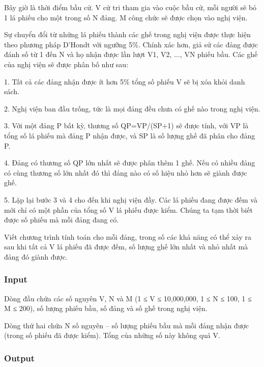 



   Bây giờ là thời điểm bầu cử. V cử tri tham gia vào cuộc bầu cử, mỗi người sẽ bỏ 1 lá phiếu cho một trong số N đảng. M công chức sẽ được chọn vào nghị viện.  

   Sự chuyển đổi từ những lá phiếu thành các ghế trong nghị viện được thực hiện theo phương pháp D'Hondt với ngưỡng 5\%. Chính xác hơn, giả sử các đảng được đánh số từ 1 đến N và họ nhận được lần lượt V1, V2, ..., VN phiếu bầu. Các ghế của nghị viện sẽ được phân bố như sau:  
\begin{itemize}

    1. Tất cả các đảng nhận được ít hơn 5\% tổng số phiếu V sẽ bị xóa khỏi danh sách.   

    2. Nghị viện ban đầu trống, tức là mọi đảng đều chưa có ghế nào trong nghị viện.   

    3. Với một đảng P bất kỳ, thương số QP=VP/(SP+1) sẽ được tính, với VP là tổng số lá phiếu mà đảng P nhận được, và SP là số lượng ghế đã phân cho đảng P.   

    4. Đảng có thương số QP lớn nhất sẽ được phân thêm 1 ghế. Nếu có nhiều đảng có cùng thương số lớn nhất đó thì đảng nào có số hiệu nhỏ hơn sẽ giành được ghế.   

    5. Lặp lại bước 3 và 4 cho đến khi nghị viện đầy. Các lá phiếu đang được đếm và mới chỉ có một phần của tổng số V lá phiếu được kiểm. Chúng ta tạm thời biết được số phiếu mà mỗi đảng đang có.   
\end{itemize}

   Viết chương trình tính toán cho mỗi đảng, trong số các khả năng có thể xảy ra sau khi tất cả V lá phiếu đã được đếm, số lượng ghế lớn nhất và nhỏ nhất mà đảng đó giành được.  

\subsubsection{   Input  }

   Dòng đầu chứa các số nguyên V, N và M (1 ≤ V ≤ 10,000,000, 1 ≤ N ≤ 100, 1 ≤ M ≤ 200), số lượng phiếu bầu, số đảng và số ghế trong nghị viện.  

   Dòng thứ hai chứa N số nguyên – số lượng phiếu bầu mà mỗi đảng nhận được (trong số phiếu đã được kiểm). Tổng của những số này không quá V.  

\subsubsection{   Output  }

